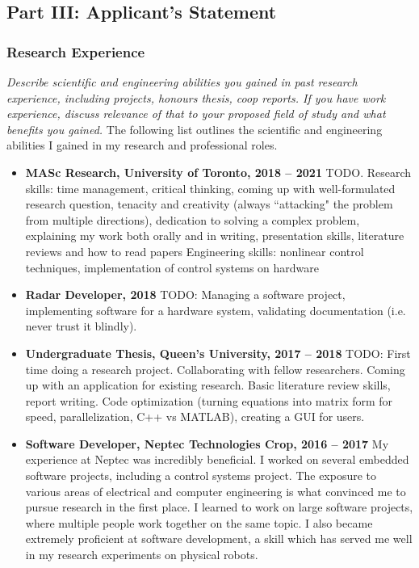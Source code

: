 \documentclass[a4paper,12pt]{article}
\begin{document}
\subsection*{Part III: Applicant's Statement}
\subsubsection*{Research Experience}
\textit{Describe scientific and engineering abilities you gained in past
    research experience, including projects, honours thesis, coop reports. If
    you have work experience, discuss relevance of that to your proposed field
of study and what benefits you gained.}
The following list outlines the scientific and engineering abilities I gained in
my research and professional roles.
\begin{itemize}
    \item \textbf{MASc Research, University of Toronto, 2018 -- 2021}
        TODO.
        Research skills: time management, critical thinking, coming up with
        well-formulated research question, tenacity and creativity
        (always ``attacking" the problem from multiple directions), dedication
        to solving a complex problem, explaining
        my work both orally and in writing, presentation skills, 
        literature reviews and how to read papers
        Engineering skills: nonlinear control techniques, implementation of
        control systems on hardware

    \item \textbf{Radar Developer, 2018}
        TODO:
        Managing a software project, implementing software for a hardware
        system, validating documentation (i.e. never trust it blindly).

    \item \textbf{Undergraduate Thesis, Queen's University, 2017 -- 2018}
        TODO:
        First time doing a research project. Collaborating with fellow
        researchers. Coming up with an application for existing research. Basic
        literature review skills, report writing. Code optimization (turning
        equations into matrix form for speed, parallelization, C++ vs MATLAB),
        creating a GUI for users.

    \item \textbf{Software Developer, Neptec Technologies Crop, 2016 -- 2017}
        My experience at Neptec was incredibly beneficial.
        I worked on several embedded software projects, including a control
        systems project. The exposure to various areas of electrical and
        computer engineering is what convinced me to pursue research in the
        first place.
        I learned to work on large software projects, where multiple people work
        together on the same topic.
        I also became extremely proficient at software development, a skill
        which has served me well in my research experiments on physical robots.
        
\end{itemize}
\end{document}
